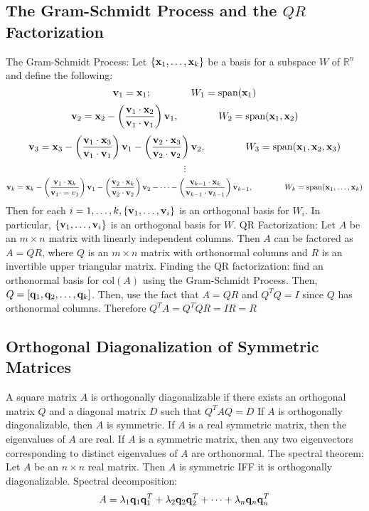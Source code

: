 \documentclass{article}
\begin{document}
        \subsection{The Gram-Schmidt Process and the \(QR\) Factorization}
        \begin{outline}
            \1 The Gram-Schmidt Process: Let \(\{\vb x_1,\ldots,\vb x_k\}\) be a basis for a subspace $W$ of \(\mathbb R^n\) and define the following: \[\vb v_1=\vb x_1;\qquad\qquad W_1=\text{span}(\vb x_1)\]\[\vb v_2=\vb x_2-\left(\dfrac{\vb v_1\cdot\vb x_2}{\vb v_1\cdot\vb v_1}\right)\vb v_1,\qquad\qquad W_2=\text{span}(\vb x_1,\vb x_2)\]\[\vb v_3=\vb x_3-\left(\dfrac{\vb v_1\cdot\vb x_3}{\vb v_1\cdot\vb v_1}\right)\vb v_1-\left(\dfrac{\vb v_2\cdot\vb x_3}{\vb v_2\cdot\vb v_2}\right)\vb v_2,\qquad\qquad W_3=\text{span}(\vb x_1,\vb x_2,\vb x_3)\]\[\vdots\]\[\vb v_k=\vb x_k-\left(\dfrac{\vb v_1\cdot\vb x_k}{\vb v_1\cdot=v_1}\right)\vb v_1-\left(\dfrac{\vb v_2\cdot\vb x_k}{\vb v_2\cdot\vb v_2}\right)\vb v_2-\cdots-\left(\dfrac{\vb v_{k-1}\cdot\vb x_k}{\vb v_{k-1}\cdot\vb v_{k-1}}\right)\vb v_{k-1},\qquad\qquad W_k=\text{span}(\vb x_1,\ldots,\vb x_k)\] Then for each \(i=1,\ldots,k,\{\vb v_1,\ldots,\vb v_i\}\) is an orthogonal basis for \(W_i\). In particular, \(\{\vb v_1,\ldots,\vb v_i\}\) is an orthogonal basis for $W$. 
            \1 QR Factorization: Let $A$ be an \(m\times n\) matrix with linearly independent columns. Then $A$ can be factored as $A=QR$, where $Q$ is an \(m\times n\) matrix with orthonormal columns and $R$ is an invertible upper triangular matrix. 
            \1 Finding the QR factorization: find an orthonormal basis for \(\text{col}(A)\) using the Gram-Schmidt Process. Then, \(Q=[\vb q_1,\vb q_2,\ldots,\vb q_k]\). Then, use the fact that \(A=QR\) and \(Q^TQ=I\) since $Q$ has orthonormal columns. Therefore \(Q^TA=Q^TQR=IR=R\)
        \end{outline}
        \subsection{Orthogonal Diagonalization of Symmetric Matrices}
        \begin{outline}
            \1 A square matrix $A$ is orthogonally diagonalizable if there exists an orthogonal matrix $Q$ and a diagonal matrix $D$ such that \(Q^TAQ=D\)
            \1 If $A$ is orthogonally diagonalizable, then $A$ is symmetric. 
            \1 If $A$ is a real symmetric matrix, then the eigenvalues of $A$ are real. 
            \1 If $A$ is a symmetric matrix, then any two eigenvectors corresponding to distinct eigenvalues of $A$ are orthonormal. 
            \1 The spectral theorem: Let $A$ be an \(n\times n\) real matrix. Then $A$ is symmetric IFF it is orthogonally diagonalizable. 
            \1 Spectral decomposition: \[A=\lambda_1\vb q_1\vb q_1^T+\lambda_2\vb q_2\vb q_2^T+\cdots+\lambda_n\vb q_n\vb q_n^T\]

        \end{outline}
\end{document}
